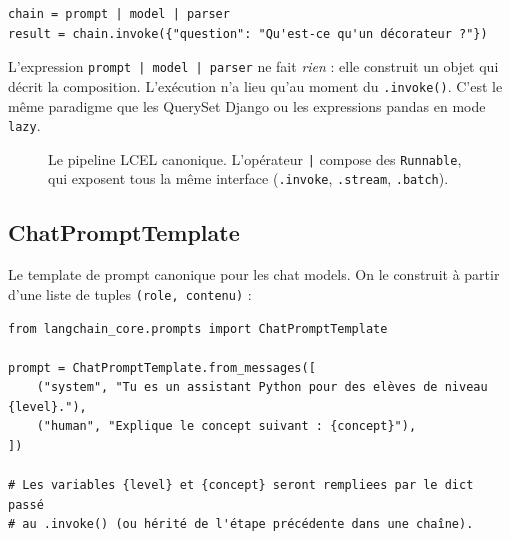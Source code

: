 \documentclass[11pt,a4paper]{article}
\begin{document}
\begin{verbatim}
chain = prompt | model | parser
result = chain.invoke({"question": "Qu'est-ce qu'un décorateur ?"})
\end{verbatim}

L'expression \texttt{prompt | model | parser} ne fait \emph{rien} : elle construit un objet qui décrit la composition. L'exécution n'a lieu qu'au moment du \texttt{.invoke()}. C'est le même paradigme que les QuerySet Django ou les expressions pandas en mode \texttt{lazy}.

\begin{figure}[h]
\centering
{}
\caption{Le pipeline LCEL canonique. L'opérateur \texttt{|} compose des \texttt{Runnable}, qui exposent tous la même interface (\texttt{.invoke}, \texttt{.stream}, \texttt{.batch}).}
\end{figure}

\subsection{ChatPromptTemplate}

Le template de prompt canonique pour les chat models. On le construit à partir d'une liste de tuples \texttt{(role, contenu)} :

\begin{verbatim}
from langchain_core.prompts import ChatPromptTemplate

prompt = ChatPromptTemplate.from_messages([
    ("system", "Tu es un assistant Python pour des elèves de niveau {level}."),
    ("human", "Explique le concept suivant : {concept}"),
])

# Les variables {level} et {concept} seront rempliees par le dict passé
# au .invoke() (ou hérité de l'étape précédente dans une chaîne).
\end{verbatim}
\end{document}
